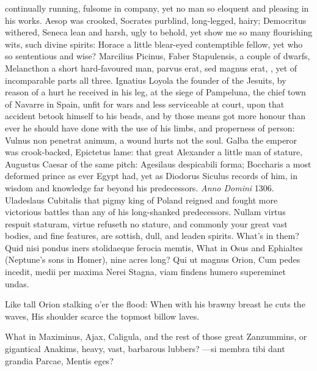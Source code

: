 {continually running, fulsome in company, yet no man so eloquent and
pleasing in his works. Aesop was crooked, Socrates purblind,
long-legged, hairy; Democritus withered, Seneca lean and harsh, ugly to
behold, yet show me so many flourishing wits, such divine spirits:
Horace a little blear-eyed contemptible fellow, yet who so sententious
and wise? Marcilius Picinus, Faber Stapulensis, a couple of dwarfs,
Melancthon a short hard-favoured man, parvus erat, sed magnus
erat, \etc{}, yet of incomparable parts all three. Ignatius Loyola
the founder of the Jesuits, by reason of a hurt he received in his leg,
at the siege of Pampeluna, the chief town of Navarre in Spain, unfit
for wars and less serviceable at court, upon that accident betook
himself to his beads, and by those means got more honour than ever he
should have done with the use of his limbs, and properness of person:
Vulnus non penetrat animum, a wound hurts not the soul. Galba the
emperor was crook-backed, Epictetus lame: that great Alexander a little
man of stature, Augustus Caesar of the same pitch: Agesilaus
despicabili forma; Boccharis a most deformed prince as ever Egypt had,
yet as Diodorus Siculus records of him, in wisdom and knowledge
far beyond his predecessors. \emph{Anno Domini} 1306.  Uladeslaus
Cubitalis that pigmy king of Poland reigned and fought more victorious
battles than any of his long-shanked predecessors. Nullam virtus
respuit staturam, virtue refuseth no stature, and commonly your great
vast bodies, and fine features, are sottish, dull, and leaden spirits.
What's in them? Quid nisi pondus iners stolidaeque ferocia
memtis, What in Osus and Ephialtes (Neptune's sons in Homer), nine
acres long?
Qui ut magnus Orion,
Cum pedes incedit, medii per maxima Nerei
Stagna, viam findens humero supereminet undas.

Like tall Orion stalking o'er the flood:
When with his brawny breast he cuts the waves,
His shoulder scarce the topmost billow laves.

What in Maximinus, Ajax, Caligula, and the rest of those great
Zanzummins, or gigantical Anakims, heavy, vast, barbarous lubbers?
---si membra tibi dant grandia Parcae,
Mentis eges?

}

